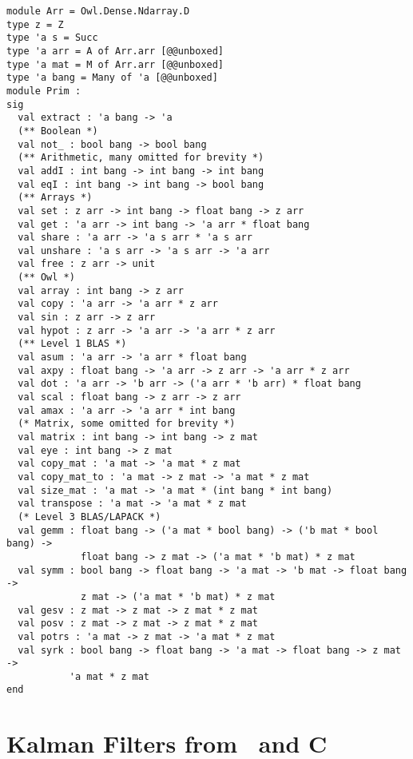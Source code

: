 \vspace*{\fill}
\begin{center}
\begin{verbatim}
module Arr = Owl.Dense.Ndarray.D
type z = Z
type 'a s = Succ
type 'a arr = A of Arr.arr [@@unboxed]
type 'a mat = M of Arr.arr [@@unboxed]
type 'a bang = Many of 'a [@@unboxed]
module Prim :
sig
  val extract : 'a bang -> 'a
  (** Boolean *)
  val not_ : bool bang -> bool bang
  (** Arithmetic, many omitted for brevity *)
  val addI : int bang -> int bang -> int bang
  val eqI : int bang -> int bang -> bool bang
  (** Arrays *)
  val set : z arr -> int bang -> float bang -> z arr
  val get : 'a arr -> int bang -> 'a arr * float bang
  val share : 'a arr -> 'a s arr * 'a s arr
  val unshare : 'a s arr -> 'a s arr -> 'a arr
  val free : z arr -> unit
  (** Owl *)
  val array : int bang -> z arr
  val copy : 'a arr -> 'a arr * z arr
  val sin : z arr -> z arr
  val hypot : z arr -> 'a arr -> 'a arr * z arr
  (** Level 1 BLAS *)
  val asum : 'a arr -> 'a arr * float bang
  val axpy : float bang -> 'a arr -> z arr -> 'a arr * z arr
  val dot : 'a arr -> 'b arr -> ('a arr * 'b arr) * float bang
  val scal : float bang -> z arr -> z arr
  val amax : 'a arr -> 'a arr * int bang
  (* Matrix, some omitted for brevity *)
  val matrix : int bang -> int bang -> z mat
  val eye : int bang -> z mat
  val copy_mat : 'a mat -> 'a mat * z mat
  val copy_mat_to : 'a mat -> z mat -> 'a mat * z mat
  val size_mat : 'a mat -> 'a mat * (int bang * int bang)
  val transpose : 'a mat -> 'a mat * z mat
  (* Level 3 BLAS/LAPACK *)
  val gemm : float bang -> ('a mat * bool bang) -> ('b mat * bool bang) ->
             float bang -> z mat -> ('a mat * 'b mat) * z mat
  val symm : bool bang -> float bang -> 'a mat -> 'b mat -> float bang ->
             z mat -> ('a mat * 'b mat) * z mat
  val gesv : z mat -> z mat -> z mat * z mat
  val posv : z mat -> z mat -> z mat * z mat
  val potrs : 'a mat -> z mat -> 'a mat * z mat
  val syrk : bool bang -> float bang -> 'a mat -> float bang -> z mat ->
           'a mat * z mat
end
\end{verbatim}
\end{center}
\vfill

\clearpage
\section{Kalman Filters from \lang\ and C}

